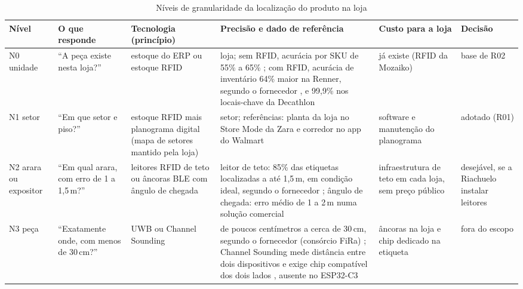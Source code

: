 \begin{table}[htbp]
    \centering
    \caption{Níveis de granularidade da localização do produto na loja}
    \label{tab:r2-granularidade}
    \scriptsize
    \setlength{\tabcolsep}{3pt}
    \renewcommand{\arraystretch}{1.25}
    \begin{tabularx}{\textwidth}{@{}
        >{\RaggedRight\arraybackslash}p{1.2cm}
        >{\RaggedRight\arraybackslash}p{2.2cm}
        >{\RaggedRight\arraybackslash}X
        >{\RaggedRight\arraybackslash}X
        >{\RaggedRight\arraybackslash}p{2.2cm}
        >{\RaggedRight\arraybackslash}p{1.9cm}@{}}
        \toprule
        \textbf{Nível} & \textbf{O que responde} & \textbf{Tecnologia (princípio)} & \textbf{Precisão e dado de referência} & \textbf{Custo para a loja} & \textbf{Decisão} \\
        \midrule
        N0 unidade & ``A peça existe nesta loja?'' & estoque do ERP ou estoque RFID & loja; sem RFID, acurácia por SKU de 55\% a 65\% \cite{auburn2026acuracia}; com RFID, acurácia de inventário 64\% maior na Renner, segundo o fornecedor \cite{sensormatic2022renner}, e 99,9\% nos locais-chave da Decathlon \cite{rfidnews2026decathlon} & já existe (RFID da Mozaiko) \cite{tiinside2022riachuelo} & base de R02 \\
        \addlinespace
        N1 setor & ``Em que setor e piso?'' & estoque RFID mais planograma digital (mapa de setores mantido pela loja) & setor; referências: planta da loja no Store Mode da Zara \cite{inditex2021storemode} e corredor no app do Walmart \cite{walmart2019mapas} & software e manutenção do planograma & \cellcolor{r2laranjaclaro}adotado (R01) \\
        \addlinespace
        N2 arara ou expositor & ``Em qual arara, com erro de 1 a 1,5\,m?'' & leitores RFID de teto ou âncoras BLE com ângulo de chegada & leitor de teto: 85\% das etiquetas localizadas a até 1,5\,m, em condição ideal, segundo o fornecedor \cite{atlasrfid2026xarray}; ângulo de chegada: erro médio de 1 a 2\,m numa solução comercial \cite{bluetooth2022direction} & infraestrutura de teto em cada loja, sem preço público & desejável, se a Riachuelo instalar leitores \\
        \addlinespace
        N3 peça & ``Exatamente onde, com menos de 30\,cm?'' & UWB ou Channel Sounding & de poucos centímetros a cerca de 30\,cm, segundo o fornecedor (consórcio FiRa) \cite{fira2026uwb}; Channel Sounding mede distância entre dois dispositivos e exige chip compatível dos dois lados \cite{bluetooth2024channel}, ausente no ESP32-C3 \cite{espressif2026esp32c3} & âncoras na loja e chip dedicado na etiqueta & fora do escopo \\
        \bottomrule
    \end{tabularx}
\end{table}

